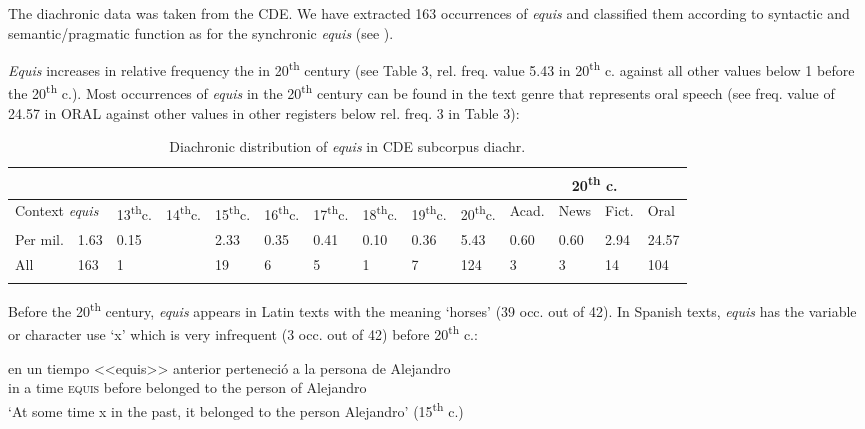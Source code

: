 \documentclass[output=paper]{langsci/langscibook}
\begin{document}
The diachronic data was taken from the CDE. We have extracted 163 occurrences of \textit{equis} and classified them according to syntactic and semantic/pragmatic function as for the synchronic \textit{equis} (see ).

\textit{Equis} increases in relative frequency the in 20\textsuperscript{th} century (see Table 3, rel. freq. value 5.43 in 20\textsuperscript{th} c. against all other values below 1 before the 20\textsuperscript{th} c.). Most occurrences of \textit{equis} in the 20\textsuperscript{th} century can be found in the text genre that represents oral speech (see freq. value of 24.57 in ORAL against other values in other registers below rel. freq. 3 in Table 3):

\begin{table}
\caption{Diachronic distribution of \textit{equis} in CDE subcorpus diachr.}
\label{tab:3:Equis MexSp. CDE}
 \begin{tabularx}{\textwidth}{XXXXXXXXXX|XXXX}
  \lsptoprule
 & &  &  &  &  &  &  &  &  & \multicolumn{4}{c}{20\textsuperscript{th} c.\cellcolor[gray]{0.8}}\\
  \midrule
  \multicolumn{2}{p{1.5cm}}{Context \textit{equis}} & 13\textsuperscript{th}c. & 14\textsuperscript{th}c. & 15\textsuperscript{th}c. & 16\textsuperscript{th}c. & 17\textsuperscript{th}c. & 18\textsuperscript{th}c. & 19\textsuperscript{th}c. & 20\textsuperscript{th}c. & Acad. & News & Fict. & Oral\\
  \midrule
  Per mil.  & 1.63 & 0.15 &  & 2.33 & 0.35 & 0.41 & 0.10 & 0.36 & 5.43\cellcolor[gray]{0.8} & 0.60 & 0.60 & 2.94 & \footnotesize 24.57\cellcolor[gray]{0.6}\\
  \midrule
  All & 163 & 1 &  & 19 & 6 & 5 & 1 & 7 & 124\cellcolor[gray]{0.8} & 3 & 3 & 14 & 104\cellcolor[gray]{0.6}\\
  \lspbottomrule
 \end{tabularx}
\end{table}

Before the 20\textsuperscript{th} century, \textit{equis} appears in Latin texts with the meaning ‘horses’ (39 occ. out of 42). In Spanish texts, \textit{equis} has the variable or character use ‘x’ which is very infrequent (3 occ. out of 42) before 20\textsuperscript{th} c.:

\ea
\gll en un tiempo <<equis>> anterior perteneció a la persona de Alejandro\\
in a time \textsc{equis} before belonged to the person of Alejandro\\
\glt ‘At some time x in the past, it belonged to the person Alejandro’ (15\textsuperscript{th} c.)
\z
\end{document}
